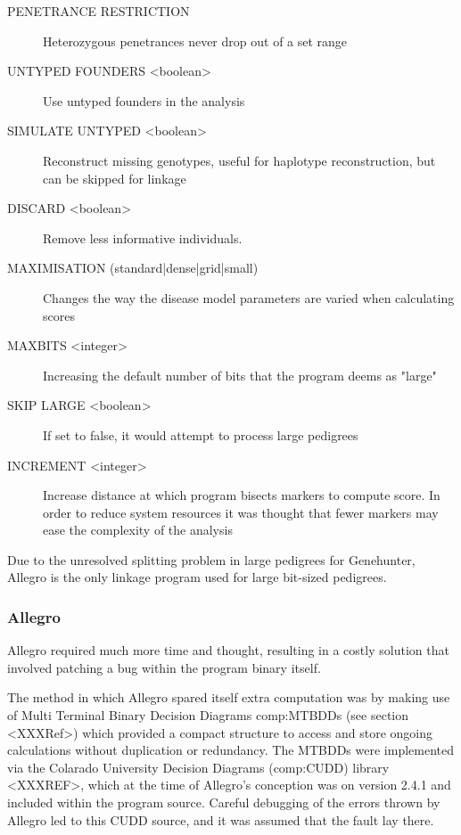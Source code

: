 \begin{description}
\item[\footnotesize PENETRANCE RESTRICTION]{Heterozygous penetrances never drop out of a set range}
\item[\footnotesize UNTYPED FOUNDERS <boolean>]{Use untyped founders in the analysis}
\item[\footnotesize SIMULATE UNTYPED <boolean>]{Reconstruct missing genotypes, useful for haplotype reconstruction, but can be skipped for linkage}
\item[\footnotesize DISCARD <boolean>]{Remove less informative individuals.}
\item[\footnotesize MAXIMISATION (standard|dense|grid|small)]{Changes the way the disease model parameters are varied when calculating scores}
\item[\footnotesize MAXBITS <integer>]{Increasing the default number of bits that the program deems as "large"}
\item[\footnotesize SKIP LARGE <boolean>]{If set to false, it would attempt to process large pedigrees}
\item[\footnotesize INCREMENT <integer>]{Increase distance at which program bisects markers to compute score. In order to reduce system resources it was thought that fewer markers may ease the complexity of the analysis}
\end{description}

Due to the unresolved splitting problem in large pedigrees for Genehunter, Allegro is the only linkage program used for large bit-sized pedigrees.


\subsubsection{Allegro}\label{ref:meth:allegrobigdata}

Allegro required much more time and thought, resulting in a costly solution that involved patching a bug within the program binary itself.  

The method in which Allegro spared itself extra computation was by making use of Multi Terminal Binary Decision Diagrams \gls{comp:MTBDD}s (see section <XXXRef>) which provided a compact structure to access and store ongoing calculations without duplication or redundancy. The MTBDDs were implemented via the Colarado University Decision Diagrams (\gls{comp:CUDD}) library <XXXREF>, which at the time of Allegro's conception was on version 2.4.1 and included within the program source.  Careful debugging of the errors thrown by Allegro led to this CUDD source, and it was assumed that the fault lay there.

